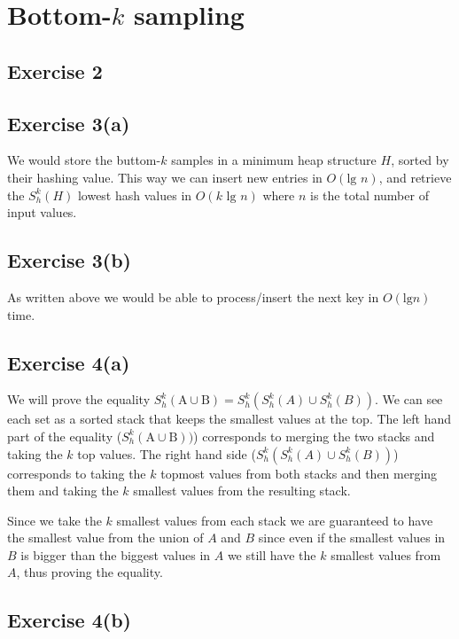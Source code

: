 \section{Bottom-$k$ sampling}

\subsection{Exercise 2}

\subsection{Exercise 3(a)}
\label{sec:ex3a}
We would store the buttom-$k$ samples in a minimum heap structure $H$, sorted by
their hashing value. This way we can insert new entries in $O(\text{lg } n)$,
and retrieve the $S^{k}_{h}(H)$ lowest hash values in $O(k \text{ lg } n)$ where
$n$ is the total number of input values.

\subsection{Exercise 3(b)}
As written above we would be able to process/insert the next key in $O(\text{lg
} n)$ time.

\subsection{Exercise 4(a)}
We will prove the equality $S^{k}_{h}(\text{A} \cup \text{B}) =
S^{k}_{h}(S^{k}_{h}(A) \cup S^{k}_{h}(B))$.
%
We can see each set as a sorted stack that keeps the smallest values at the
top. The left hand part of the equality ($S^{k}_{h}(\text{A} \cup \text{B}))$)
corresponds to merging the two stacks and taking the $k$ top values.
%
The right hand side ($S^{k}_{h}(S^{k}_{h}(A) \cup S^{k}_{h}(B))$) corresponds to
taking the $k$ topmost values from both stacks and then merging them and taking
the $k$ smallest values from the resulting stack.

Since we take the $k$ smallest values from each stack we are guaranteed to have
the smallest value from the union of $A$ and $B$ since even if the smallest
values in $B$ is bigger than the biggest values in $A$ we still have the $k$
smallest values from $A$, thus proving the equality.

\subsection{Exercise 4(b)}

